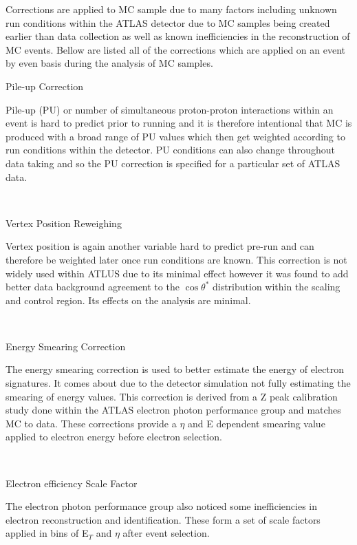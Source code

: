    Corrections are applied to MC sample due to many factors including unknown run conditions within the ATLAS detector due to MC samples being created earlier than data collection as well as known inefficiencies in the reconstruction of MC events. Bellow are listed all of the corrections which are applied on an event by even basis during the analysis of MC samples.\\


   {\bf\raggedright Pile-up Correction}

   {\raggedright Pile-up (PU) or number of simultaneous proton-proton interactions within an event is hard to predict prior to running and it is therefore intentional that MC is produced with a broad range of PU values which then get weighted according to run conditions within the detector. PU conditions can also change throughout data taking and so the PU correction is specified for a particular set of ATLAS data.}\\

   {\bf\raggedright Vertex Position Reweighing}

   {\raggedright Vertex position is again another variable hard to predict pre-run and can therefore be weighted later once run conditions are known. This correction is not widely used within ATLUS due to its minimal effect however it was found to add better data background agreement to the $\cos{\theta^{*}}$ distribution within the scaling and control region. Its effects on the analysis are minimal.}\\

   {\bf\raggedright Energy Smearing Correction}

   {\raggedright The energy smearing correction is used to better estimate the energy of electron signatures. It comes about due to the detector simulation not fully estimating the smearing of energy values. This correction is derived from a Z peak calibration study \cite{} done within the ATLAS electron photon performance group and matches MC to data. These corrections provide a $\eta$ and E dependent smearing value applied to electron energy before electron selection.}\\

   {\bf\raggedright Electron efficiency Scale Factor}

   {\raggedright The electron photon performance group also noticed some inefficiencies in electron reconstruction and identification. These form a set of scale factors applied in bins of E$_{T}$ and $\eta$ after event selection.}\\


